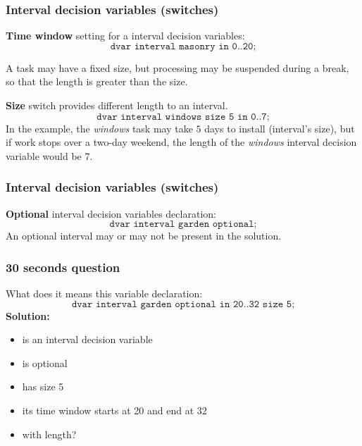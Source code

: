 \begin{frame} \frametitle{Interval decision variables (switches)}
\pause
\textbf{Time window} setting for a interval decision variables:\pause
\begin{equation*}
\texttt{dvar interval masonry in 0..20;} 
\end{equation*}

\pause\medskip

A task may have a fixed size, but processing may be suspended during a break, so that the length is greater than the size.

\pause\medskip

\textbf{Size} switch provides different length to an interval.
\pause
\begin{equation*}
\texttt{dvar interval windows size 5 in 0..7;} 
\end{equation*}
\pause
In the example, the \emph{windows} task may take $5$ days to install (interval's size), but if work stops over a two-day weekend, the length of the \emph{windows} interval decision variable would be 7.

\end{frame}


\begin{frame} \frametitle{Interval decision variables (switches)}

\textbf{Optional} interval decision variables declaration:\pause
\begin{equation*}
\texttt{dvar interval garden optional;} 
\end{equation*}
\pause
An optional interval may or may not be present in the solution.

\end{frame}


\begin{frame} \frametitle{30 seconds question}

What does it means this variable declaration:\pause
\begin{equation*}
\texttt{dvar interval garden optional in 20..32 size 5;} 
\end{equation*}
\pause
\textbf{Solution:} 
\pause
\begin{itemize}[<+->]
\item is an interval decision variable 
\item is optional
\item has size 5
\item its time window starts at 20 and end at 32
\item with length?
\end{itemize}

\end{frame}

